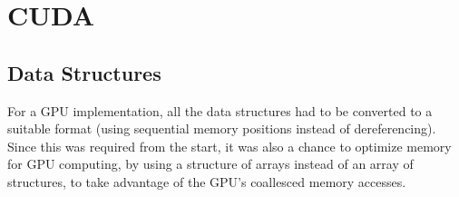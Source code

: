 \documentclass[9pt,twocolumn]{scrartcl}
\begin{document}
%
%


\section{CUDA}
\label{sec:cuda}
\subsection{Data Structures}
For a GPU implementation, all the data structures had to be converted to a suitable format (using sequential memory positions instead of dereferencing). Since this was required from the start, it was also a chance to optimize memory for GPU computing, by using a structure of arrays instead of an array of structures, to take advantage of the GPU's coallesced memory accesses.
\end{document}
